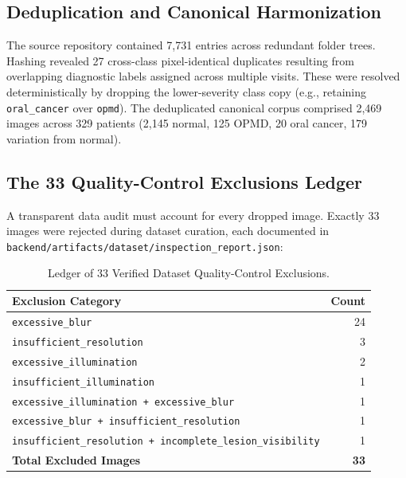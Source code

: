 \documentclass[11pt,a4paper]{report}
\newcommand{\artifact}[1]{\texttt{\footnotesize #1}}
\begin{document}
\subsection{Deduplication and Canonical Harmonization}
The source repository contained 7,731 entries across redundant folder trees. Hashing revealed 27 cross-class pixel-identical duplicates resulting from overlapping diagnostic labels assigned across multiple visits. These were resolved deterministically by dropping the lower-severity class copy (e.g., retaining \texttt{oral\_cancer} over \texttt{opmd}). The deduplicated canonical corpus comprised 2,469 images across 329 patients (2,145 normal, 125 OPMD, 20 oral cancer, 179 variation from normal).

\subsection{The 33 Quality-Control Exclusions Ledger}
A transparent data audit must account for every dropped image. Exactly 33 images were rejected during dataset curation, each documented in \artifact{backend/artifacts/dataset/inspection\_report.json}:
\begin{table}[H]
\centering
\small
\begin{tabular}{lr}
\toprule
\textbf{Exclusion Category} & \textbf{Count} \\
\midrule
\texttt{excessive\_blur} & 24 \\
\texttt{insufficient\_resolution} & 3 \\
\texttt{excessive\_illumination} & 2 \\
\texttt{insufficient\_illumination} & 1 \\
\texttt{excessive\_illumination + excessive\_blur} & 1 \\
\texttt{excessive\_blur + insufficient\_resolution} & 1 \\
\texttt{insufficient\_resolution + incomplete\_lesion\_visibility} & 1 \\
\midrule
\textbf{Total Excluded Images} & \textbf{33} \\
\bottomrule
\end{tabular}
\caption{Ledger of 33 Verified Dataset Quality-Control Exclusions.}
\label{tab:qc_ledger}
\end{table}
\end{document}
